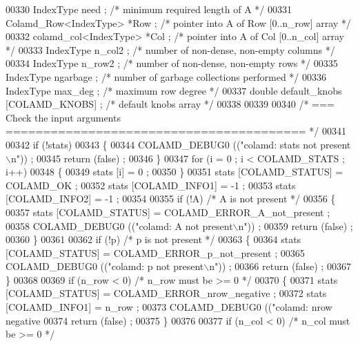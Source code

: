 \begin{DoxyCode}
{{00330   IndexType need ;      \textcolor{comment}{/* minimum required length of A */}
00331   Colamd\_Row<IndexType> *Row ;   \textcolor{comment}{/* pointer into A of Row [0..n\_row] array */}
00332   colamd\_col<IndexType> *Col ;   \textcolor{comment}{/* pointer into A of Col [0..n\_col] array */}
00333   IndexType n\_col2 ;    \textcolor{comment}{/* number of non-dense, non-empty columns */}
00334   IndexType n\_row2 ;    \textcolor{comment}{/* number of non-dense, non-empty rows */}
00335   IndexType ngarbage ;    \textcolor{comment}{/* number of garbage collections performed */}
00336   IndexType max\_deg ;   \textcolor{comment}{/* maximum row degree */}
00337   \textcolor{keywordtype}{double} default\_knobs [COLAMD\_KNOBS] ; \textcolor{comment}{/* default knobs array */}
00338   
00339   
00340   \textcolor{comment}{/* === Check the input arguments ======================================== */}
00341   
00342   \textcolor{keywordflow}{if} (!stats)
00343   \{
00344     COLAMD\_DEBUG0 ((\textcolor{stringliteral}{"colamd: stats not present\(\backslash\)n"})) ;
00345     \textcolor{keywordflow}{return} (\textcolor{keyword}{false}) ;
00346   \}
00347   \textcolor{keywordflow}{for} (i = 0 ; i < COLAMD\_STATS ; i++)
00348   \{
00349     stats [i] = 0 ;
00350   \}
00351   stats [COLAMD\_STATUS] = COLAMD\_OK ;
00352   stats [COLAMD\_INFO1] = -1 ;
00353   stats [COLAMD\_INFO2] = -1 ;
00354   
00355   \textcolor{keywordflow}{if} (!A)   \textcolor{comment}{/* A is not present */}
00356   \{
00357     stats [COLAMD\_STATUS] = COLAMD\_ERROR\_A\_not\_present ;
00358     COLAMD\_DEBUG0 ((\textcolor{stringliteral}{"colamd: A not present\(\backslash\)n"})) ;
00359     \textcolor{keywordflow}{return} (\textcolor{keyword}{false}) ;
00360   \}
00361   
00362   \textcolor{keywordflow}{if} (!p)   \textcolor{comment}{/* p is not present */}
00363   \{
00364     stats [COLAMD\_STATUS] = COLAMD\_ERROR\_p\_not\_present ;
00365     COLAMD\_DEBUG0 ((\textcolor{stringliteral}{"colamd: p not present\(\backslash\)n"})) ;
00366     \textcolor{keywordflow}{return} (\textcolor{keyword}{false}) ;
00367   \}
00368   
00369   \textcolor{keywordflow}{if} (n\_row < 0)  \textcolor{comment}{/* n\_row must be >= 0 */}
00370   \{
00371     stats [COLAMD\_STATUS] = COLAMD\_ERROR\_nrow\_negative ;
00372     stats [COLAMD\_INFO1] = n\_row ;
00373     COLAMD\_DEBUG0 ((\textcolor{stringliteral}{"colamd: nrow negative %
00374     \textcolor{keywordflow}{return} (\textcolor{keyword}{false}) ;
00375   \}
00376   
00377   \textcolor{keywordflow}{if} (n\_col < 0)  \textcolor{comment}{/* n\_col must be >= 0 */}
}}}
\end{DoxyCode}
